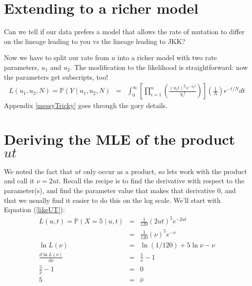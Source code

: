 \documentclass[11pt]{article}
\renewcommand{\Pr}{\mathbb{P}}
\begin{document}
\section{Extending to a richer model}
Can we tell if our data prefers a model that allows the rate of mutation to differ
on the lineage leading to you vs the lineage leading to JKK?

Now we have to split our rate from $u$ into a richer model with two rate parameters, $u_1$ and $u_2$.
The modification to the likelihood is straightforward: now the parameters
get subscripts, too!
\begin{eqnarray}
L(u_1, u_2, N)  = \Pr(Y \mid u_1, u_2, N)  & = &
  \int_{0}^{\infty} \left[ \prod_{i=1}^{n}\left(\frac{(u_it)^{y_i} e^{-u_it}}{y_i!} \right)\right] \left(\frac{1}{N}\right) e^{-t/N}dt 
\end{eqnarray}
Appendix \ref{messyTricky} goes through the gory details.

\newpage
\appendix
\section{Deriving the MLE of the product $ut$}\label{appUT}
We noted the fact that $ut$ only occur as a product, so
lets work with the product and call it $\nu=2ut$.
Recall the recipe is to find the derivative with respect to the parameter(s),
and find the parameter value that makes that derivative 0, and 
that we usually find it easier to do this on the log scale.
We'll start with Equation (\ref{likeUT}):
\begin{eqnarray*}
L(u, t) = \Pr(X=5 \mid u, t) & = &\frac{1}{120}(2ut)^5 e^{-2ut} \\
& = &\frac{1}{120}(\nu)^5 e^{-\nu} \\
\ln L(\nu) & = & \ln{(1/120)} + 5\ln\nu - \nu\\
\frac{d \ln L(\nu)}{d \nu} & = & \frac{5}{\nu} - 1 \\
\frac{5}{\hat{\nu}} - 1 & = & 0 \\
5 & = & \hat{\nu} 
\end{eqnarray*}
\end{document}
